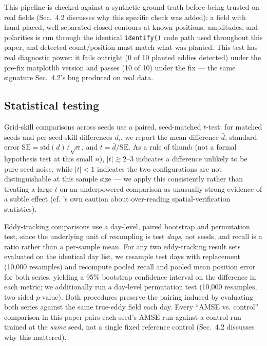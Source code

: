 \documentclass[11pt]{article}
\begin{document}
This pipeline is checked against a synthetic ground truth before being trusted on real fields (Sec.~4.2 discusses why this specific check was added): a field with hand-placed, well-separated closed contours at known positions, amplitudes, and polarities is run through the identical \texttt{identify()} code path used throughout this paper, and detected count/position must match what was planted. This test has real diagnostic power: it fails outright (0 of 10 planted eddies detected) under the pre-fix matplotlib version and passes (10 of 10) under the fix --- the same signature Sec.~4.2's bug produced on real data.

\subsection{Statistical testing}

Grid-skill comparisons across seeds use a paired, seed-matched $t$-test: for matched seeds and per-seed skill differences $d_i$, we report the mean difference $\bar{d}$, standard error $\mathrm{SE}=\mathrm{std}(d)/\sqrt{n}$, and $t=\bar{d}/\mathrm{SE}$. As a rule of thumb (not a formal hypothesis test at this small $n$), $|t|\gtrsim 2$--3 indicates a difference unlikely to be pure seed noise, while $|t|<1$ indicates the two configurations are not distinguishable at this sample size --- we apply this consistently rather than treating a large $t$ on an underpowered comparison as unusually strong evidence of a subtle effect (cf. \citealp{Gilleland2009}'s own caution about over-reading spatial-verification statistics).

Eddy-tracking comparisons use a day-level, paired bootstrap and permutation test, since the underlying unit of resampling is test \textit{days}, not seeds, and recall is a ratio rather than a per-sample mean. For any two eddy-tracking result sets evaluated on the identical day list, we resample test days with replacement (10,000 resamples) and recompute pooled recall and pooled mean position error for both series, yielding a 95\% bootstrap confidence interval on the difference in each metric; we additionally run a day-level permutation test (10,000 resamples, two-sided $p$-value). Both procedures preserve the pairing induced by evaluating both series against the same true-eddy field each day. Every ``AMSE vs. control'' comparison in this paper pairs each seed's AMSE run against a control run trained at the \textit{same} seed, not a single fixed reference control (Sec.~4.2 discusses why this mattered).
\end{document}
